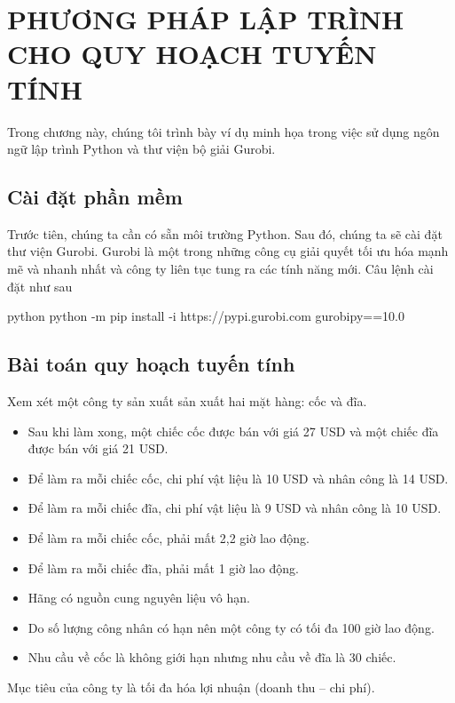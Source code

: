 \chapter{PHƯƠNG PHÁP LẬP TRÌNH CHO QUY HOẠCH TUYẾN TÍNH}

Trong chương này, chúng tôi trình bày ví dụ minh họa trong việc sử dụng ngôn ngữ lập trình Python và thư viện bộ giải Gurobi\cite{gurobi}.

\section{Cài đặt phần mềm}

Trước tiên, chúng ta cần có sẵn môi trường Python. Sau đó, chúng ta sẽ cài đặt thư viện Gurobi. Gurobi là một trong những công cụ giải quyết tối ưu hóa mạnh mẽ và nhanh nhất và công ty liên tục tung ra các tính năng mới. Câu lệnh cài đặt như sau
\begin{mintedbox}{python}
python -m pip install -i https://pypi.gurobi.com gurobipy==10.0
\end{mintedbox}

\section{Bài toán quy hoạch tuyến tính}

Xem xét một công ty sản xuất sản xuất hai mặt hàng: cốc và đĩa. 
\begin{itemize}
    \item Sau khi làm xong, một chiếc cốc được bán với giá 27 USD và một chiếc đĩa được bán với giá 21 USD.
    \item Để làm ra mỗi chiếc cốc, chi phí vật liệu là 10 USD và nhân công là 14 USD.
    \item Để làm ra mỗi chiếc đĩa, chi phí vật liệu là 9 USD và nhân công là 10 USD.
    \item Để làm ra mỗi chiếc cốc, phải mất 2,2 giờ lao động.
    \item Để làm ra mỗi chiếc đĩa, phải mất 1 giờ lao động.
    \item Hãng có nguồn cung nguyên liệu vô hạn.
    \item Do số lượng công nhân có hạn nên một công ty có tối đa 100 giờ lao động.
    \item Nhu cầu về cốc là không giới hạn nhưng nhu cầu về đĩa là 30 chiếc.
\end{itemize}

Mục tiêu của công ty là tối đa hóa lợi nhuận (doanh thu – chi phí).

